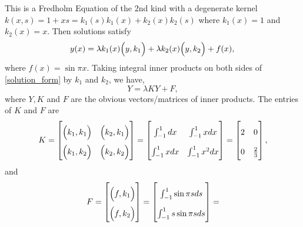\documentclass{homework}
\begin{document}
\begin{solution}
This is a Fredholm Equation of the 2nd kind with a degenerate kernel $k(x,s) = 1 + xs = k_1(s)k_1(x) + k_2(x)k_2(s)$ where $k_1(x) = 1$ and $k_2(x) = x$. Then solutions satisfy
  \begin{equation}
    y(x) = \lambda k_1(x) \Big(y,k_1\Big) + \lambda k_2(x)\Big(y,k_2\Big) + f(x), \label{solution_form}\\
  \end{equation}
  where $f(x) = \sin \pi x$. Taking integral inner products on both sides of \eqref{solution_form} by $k_1$ and $k_2$, we have,
  \begin{equation}
    Y = \lambda KY + F,\label{system}
  \end{equation}
  where $Y,K$ and $F$ are the obvious vectors/matrices of inner products.  The entries of $K$ and $F$ are
  $$
    \renewcommand{\arraystretch}{2}
    K = \begin{bmatrix}
	\Big(k_1,k_1\Big) & \Big(k_2,k_1\Big)\\
	\Big(k_1,k_2\Big) & \Big(k_2,k_2\Big)\\
    \end{bmatrix}
    =
     \begin{bmatrix}
	\int_{-1}^1dx  & \int_{-1}^1xdx\cr 
	\int_{-1}^1xdx  & \int_{-1}^1x^2dx\cr 
     \end{bmatrix}
    =
      \begin{bmatrix}
	{\displaystyle 2 }&0 \cr 0& \frac 23\cr
      \end{bmatrix}, 
  $$
  and
  $$
    \renewcommand{\arraystretch}{2}
    F = 
	\begin{bmatrix}
	 \Big(f,k_1\Big) \\
	 \Big(f,k_2\Big) 
	\end{bmatrix} 
      =
	\begin{bmatrix}
	  \int_{-1}^1\sin \pi s ds\cr 
	  \int_{-1}^1s \sin \pi s ds\cr 
	\end{bmatrix} 
      =
$$
\end{solution}
\end{document}
